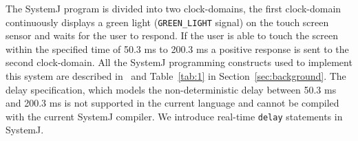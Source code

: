 The SystemJ program is divided into two clock-domains, the first
clock-domain continuously displays a green light (\texttt{GREEN\_LIGHT}
signal) on the touch screen sensor and waits for the user to respond. If
the user is able to touch the screen within the specified time of 50.3
ms to 200.3 ms a positive response is sent to the second
clock-domain. All the SystemJ programming constructs used to implement
this system are described in~\cite{amal10} and Table~\ref{tab:1} in
Section~\ref{sec:background}. The delay specification, which models the
non-deterministic delay between 50.3 ms and 200.3 ms is not supported in
the current language and cannot be compiled with the current SystemJ
compiler. We introduce real-time \texttt{delay} statements in SystemJ.


